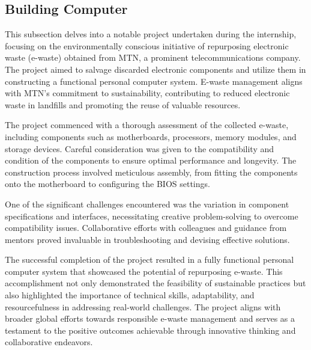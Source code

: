 \subsection{Building Computer}
This subsection delves into a notable project undertaken during the internship, focusing on the environmentally conscious initiative of repurposing electronic waste (e-waste) obtained from MTN, a prominent telecommunications company. The project aimed to salvage discarded electronic components and utilize them in constructing a functional personal computer system. E-waste management aligns with MTN's commitment to sustainability, contributing to reduced electronic waste in landfills and promoting the reuse of valuable resources.

The project commenced with a thorough assessment of the collected e-waste, including components such as motherboards, processors, memory modules, and storage devices. Careful consideration was given to the compatibility and condition of the components to ensure optimal performance and longevity. The construction process involved meticulous assembly, from fitting the components onto the motherboard to configuring the BIOS settings.

One of the significant challenges encountered was the variation in component specifications and interfaces, necessitating creative problem-solving to overcome compatibility issues. Collaborative efforts with colleagues and guidance from mentors proved invaluable in troubleshooting and devising effective solutions.

The successful completion of the project resulted in a fully functional personal computer system that showcased the potential of repurposing e-waste. This accomplishment not only demonstrated the feasibility of sustainable practices but also highlighted the importance of technical skills, adaptability, and resourcefulness in addressing real-world challenges. The project aligns with broader global efforts towards responsible e-waste management and serves as a testament to the positive outcomes achievable through innovative thinking and collaborative endeavors.
